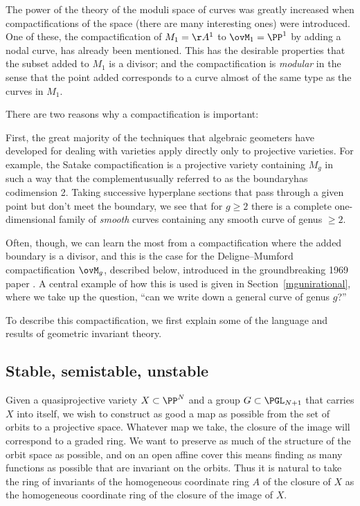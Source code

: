 The power of the theory of the moduli space of curves was greatly increased when compactifications of the space (there are many interesting ones) were introduced. One of these, the compactification
%
of $M_1 = \AA^1$ to $\ovM_1 = \PP^1$ by adding a nodal curve, has already been mentioned. This has the desirable properties that the subset added to $M_1$ is a divisor; and the compactification is \emph{modular} in the sense
%
that the point added corresponds to a curve almost of the same type as the curves in $M_1$.

There are two reasons why a compactification is  important:

First, the great majority of the techniques that algebraic geometers
have developed for dealing with varieties apply directly only to
projective varieties. For example, the
Satake compactification
%
%
is a projective variety containing $M_g$ in such a way that the
%
complement\emdash usually referred to as the
boundary\emdash has
codimension 2. Taking successive hyperplane sections that pass through
a given point but don't meet the boundary, we see that for $g\geq 2$
there is a complete one-dimensional family of \emph{smooth} curves
containing any smooth curve of genus $\geq 2$.

Often, though, we can learn the most from a compactification where the
added boundary
is a divisor, and this is the case for the Deligne--Mumford compactification
%
%
$\ovM_g$, described below,  introduced
in the
groundbreaking 1969 paper \cite{Deligne-Mumford}.
A central example of how this is used is given in
Section~\ref{mgunirational}, where we take up the question, ``can we
write down a general curve of genus $g$?''

To describe this compactification, we first explain some of the language and results of geometric
invariant theory.

\subsection*{Stable, semistable, unstable}

Given a quasiprojective variety $X \subset \PP^N$ and a group $G \subset \PGL_{N+1}$ that carries $X$ into itself, we wish to construct as good a map as possible from the set of orbits
to a projective space. Whatever map we take, the closure of the
image will correspond to a graded ring. We want to preserve as much of the structure of the orbit space as possible, and on an open affine cover
this means finding as many functions as possible that are invariant on
the orbits. Thus it is natural to take the
ring of invariants
%
%
of the homogeneous coordinate ring $A$ of the closure of $X$ as the homogeneous coordinate ring of the closure
of the image of $X$.


